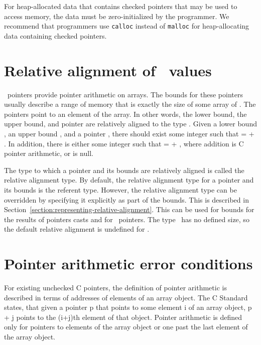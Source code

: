 For heap-allocated data that contains checked pointers that may be used to access memory, the
data must be zero-initialized by the programmer.  We recommend that programmers use
\lstinline+calloc+ instead of \lstinline+malloc+ for heap-allocating data containing checked pointers.


\section{Relative alignment of \arrayptr\ values}
\label{section:relative-alignment}

\arrayptrT\ pointers provide
pointer arithmetic on arrays. The bounds for these pointers usually
describe a range of memory that is exactly the size of some array of .
The pointers point to an element of the array. In other words, the lower
bound, the upper bound, and pointer are  relatively aligned to the type
. Given a lower bound , an upper bound , and a
pointer , there should exist some integer  such that
 =  + . In addition, there is either some
integer  such that  =  + ,
where addition is C pointer arithmetic, or  is null.

The type to which a pointer and its bounds are relatively aligned is
called the relative alignment type. By default, the relative alignment
type for a pointer and its bounds is the referent type. However, the
relative alignment type can be overridden by specifying it explicitly as
part of the bounds.  This is described in
Section~\ref{section:representing-relative-alignment}.
This can be used for bounds for the results of pointers casts and
for  \arrayptrvoid\ pointers. The type
\void\ has no defined size, so the default relative alignment is
undefined for \void.

\section{Pointer arithmetic error conditions}
\label{section:pointer-arithmetic-errors}

For existing unchecked C pointers, the definition of pointer arithmetic is
described in terms of addresses of elements of an array object. The C
Standard \cite{ISO2011} states, that given a pointer p that points to some element i of
an array object, p + j points to the (i+j)th element of that object.
Pointer arithmetic is defined only for pointers to elements of the array
object or one past the last element of the array object.

